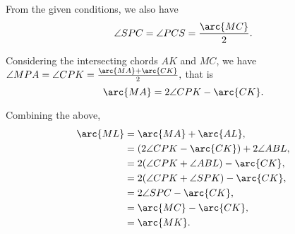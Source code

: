 \documentclass[11pt,twoside]{scrartcl}
\begin{document}
    From the given conditions, we also have
    \[\angle{SPC} = \angle{PCS} = \frac{\arc{MC}}{2}.\]

    Considering the intersecting chords $AK$ and $MC$, we have $\angle{MPA} = \angle{CPK} = \frac{\arc{MA} + \arc{CK}}{2},$ that is 
    \[\arc{MA} = 2 \angle{CPK} - \arc{CK}.\]

    Combining the above,
    \begin{align*}
        \arc{ML} &= \arc{MA} + \arc{AL}, \\
        &= (2 \angle{CPK} - \arc{CK}) + 2\angle{ABL}, \\
        &= 2 (\angle{CPK} + \angle{ABL}) - \arc{CK}, \\
        &= 2 (\angle{CPK} + \angle{SPK}) - \arc{CK}, \\
        &= 2 \angle{SPC} - \arc{CK}, \\
        &= \arc{MC} - \arc{CK}, \\
        &= \arc{MK}.
    \end{align*}
\end{document}
